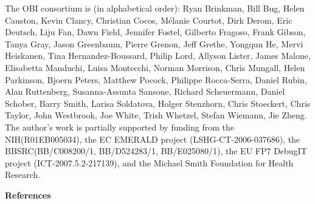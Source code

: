 \documentclass[a4paper,10pt,twocolumn]{article}
\begin{document}
The OBI consortium is (in alphabetical order): Ryan Brinkman, Bill Bug, Helen Causton, Kevin Clancy, Christian Cocos, M\'elanie Courtot, Dirk Derom, Eric Deutsch, Liju Fan, Dawn Field, Jennifer Fostel, Gilberto Fragoso, Frank Gibson, Tanya Gray, Jason Greenbaum, Pierre Grenon, Jeff Grethe, Yongqun He, Mervi Heiskanen, Tina Hernandez-Boussard, Philip Lord, Allyson Lister, James Malone, Elisabetta Manduchi, Luisa Montecchi, Norman Morrison, Chris Mungall, Helen Parkinson, Bjoern Peters, Matthew Pocock, Philippe Rocca-Serra, Daniel Rubin, Alan Ruttenberg, Susanna-Assunta Sansone, Richard Scheuermann, Daniel Schober, Barry Smith, Larisa Soldatova, Holger Stenzhorn, Chris Stoeckert, Chris Taylor, John Westbrook,  Joe White, Trish Whetzel, Stefan Wiemann, Jie Zheng. 
The author’s work is partially supported by funding from the NIH(R01EB005034), the EC EMERALD project (LSHG-CT-2006-037686), the BBSRC(BB/C008200/1, BB/D524283/1, BB/E025080/1), the EU FP7 DebugIT project (ICT-2007.5.2-217139), and the Michael Smith Foundation for Health Research.

   
\begin{small}
{\def\section*#1{}
\begin{center}
\textbf{References}
\end{center}



}
 \end{small} 
    \balance
    
\begin{acronym}




\end{acronym}
\end{document}
